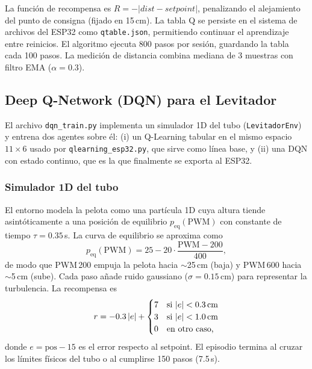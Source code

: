 \documentclass[conference]{IEEEtran}
\begin{document}
La función de recompensa es $R = -|dist - setpoint|$, penalizando el alejamiento del punto de consigna (fijado en 15\,cm). La tabla Q se persiste en el sistema de archivos del ESP32 como \texttt{qtable.json}, permitiendo continuar el aprendizaje entre reinicios. El algoritmo ejecuta 800 pasos por sesión, guardando la tabla cada 100 pasos. La medición de distancia combina mediana de 3 muestras con filtro EMA ($\alpha = 0.3$).

\subsection{Deep Q-Network (DQN) para el Levitador}

El archivo \texttt{dqn\_train.py} implementa un simulador 1D del tubo (\texttt{LevitadorEnv}) y entrena dos agentes sobre él: (i) un Q-Learning tabular en el mismo espacio $11\times6$ usado por \texttt{qlearning\_esp32.py}, que sirve como línea base, y (ii) una DQN con estado continuo, que es la que finalmente se exporta al ESP32.

\subsubsection{Simulador 1D del tubo}

El entorno modela la pelota como una partícula 1D cuya altura tiende asintóticamente a una posición de equilibrio $p_{\text{eq}}(\text{PWM})$ con constante de tiempo $\tau = 0.35$\,s. La curva de equilibrio se aproxima como
\begin{equation}
p_{\text{eq}}(\text{PWM}) = 25 - 20 \cdot \frac{\text{PWM}-200}{400},
\end{equation}
de modo que PWM\,200 empuja la pelota hacia $\sim$25\,cm (baja) y PWM\,600 hacia $\sim$5\,cm (sube). Cada paso añade ruido gaussiano ($\sigma = 0.15$\,cm) para representar la turbulencia. La recompensa es
\begin{equation}
r = -0.3\,|e| + \begin{cases} 7 & \text{si } |e| < 0.3\text{\,cm} \\ 3 & \text{si } |e| < 1.0\text{\,cm} \\ 0 & \text{en otro caso,} \end{cases}
\end{equation}
donde $e = \text{pos} - 15$ es el error respecto al setpoint. El episodio termina al cruzar los límites físicos del tubo o al cumplirse 150 pasos (7.5\,s).
\end{document}

